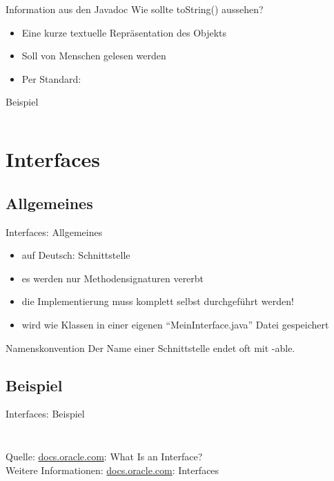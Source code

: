 \documentclass[usepdftitle=false,hyperref={pdfpagelabels=false}]{beamer}
\begin{document}
\begin{frame}{Information aus den Javadoc}
    Wie sollte toString() aussehen?
    \begin{itemize}
        \item Eine kurze textuelle Repräsentation des Objekts
        \item Soll von Menschen gelesen werden
        \item Per Standard: 
    \end{itemize}
\end{frame}

\begin{frame}{Beispiel}
    \inputminted[linenos=true, numbersep=5pt, tabsize=4, label=Node.java, frame=lines]{java}{Node.java}
\end{frame}

\section{Interfaces}
\subsection{Allgemeines}
\begin{frame}{Interfaces: Allgemeines}
    \begin{itemize}[<+->]
        \item auf Deutsch: Schnittstelle
        \item es werden nur Methodensignaturen vererbt
        \item die Implementierung muss komplett selbst durchgeführt werden!
        \item wird wie Klassen in einer eigenen "`MeinInterface.java"' Datei gespeichert
    \end{itemize}
    \pause[\thebeamerpauses]
    \begin{block}{Namenskonvention}
        Der Name einer Schnittstelle endet oft mit -able.
    \end{block}
\end{frame}

\subsection{Beispiel}
\begin{frame}{Interfaces: Beispiel}
    \inputminted[linenos=true, numbersep=5pt, tabsize=4, fontsize=\small, label=Bicycle.java, frame=lines]{java}{Bicycle.java}
    \inputminted[linenos=true, numbersep=5pt, tabsize=4, fontsize=\small, label=ACMEBicycle.java, frame=lines]{java}{ACMEBicycle.java}
    \small{Quelle: \href{http://docs.oracle.com/javase/tutorial/java/concepts/interface.html}{docs.oracle.com}: What Is an Interface?}\\
    Weitere Informationen: \href{http://docs.oracle.com/javase/tutorial/java/IandI/createinterface.html}{docs.oracle.com}: Interfaces
\end{frame}
\end{document}
